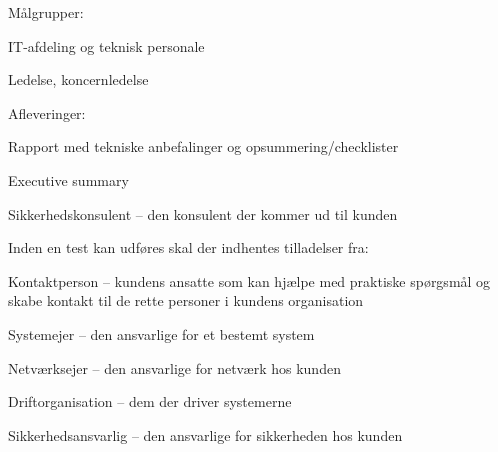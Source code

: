 \documentclass[20pt,landscape,a4paper,footrule]{foils}
\begin{document}
\begin{list1}
\item Målgrupper:
\begin{list2}
\item IT-afdeling og teknisk personale
\item Ledelse, koncernledelse
\end{list2}
\item Afleveringer:
\begin{list2}
\item Rapport med tekniske anbefalinger og opsummering/checklister
\item Executive summary
\end{list2}
\end{list1}




\begin{list1}
\item Sikkerhedskonsulent -- den konsulent der kommer ud til kunden
\item Inden en test kan udføres skal der indhentes tilladelser fra:
\begin{list2}
\item Kontaktperson -- kundens ansatte som kan hjælpe med praktiske
  spørgsmål og skabe kontakt til de rette personer i kundens organisation
\item Systemejer -- den ansvarlige for et bestemt system
\item Netværksejer -- den ansvarlige for netværk hos kunden
\item Driftorganisation -- dem der driver systemerne
\item Sikkerhedsansvarlig -- den ansvarlige for sikkerheden hos kunden
\end{list2}
\end{list1}

\end{document}
